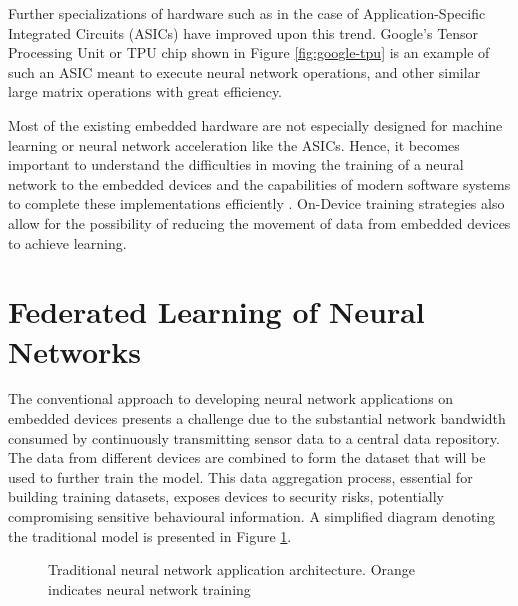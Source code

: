 Further specializations of hardware such as in the case of Application-Specific Integrated Circuits (ASICs) have improved upon this trend. Google's Tensor Processing Unit or TPU chip shown in Figure \ref{fig:google-tpu} is an example of such an ASIC meant to execute neural network operations, and other similar large matrix operations with great efficiency.

Most of the existing embedded hardware are not especially designed for machine learning or neural network acceleration like the ASICs. Hence, it becomes important to understand the difficulties in moving the training of a neural network to the embedded devices and the capabilities of modern software systems to complete these implementations efficiently \cite{zhu2023ondevice}. On-Device training strategies also allow for the possibility of reducing the movement of data from embedded devices to achieve learning.

\section{Federated Learning of Neural Networks}

The conventional approach to developing neural network applications on embedded devices presents a challenge due to the substantial network bandwidth consumed by continuously transmitting sensor data to a central data repository. The data from different devices are combined to form the dataset that will be used to further train the model. This data aggregation process, essential for building training datasets, exposes devices to security risks, potentially compromising sensitive behavioural information. A simplified diagram denoting the traditional model is presented in Figure \ref{fig:nn-traditional}.

\begin{figure}[h]
	\centering
	\caption{Traditional neural network application architecture. Orange indicates neural network training}
	\label{fig:nn-traditional}
\end{figure}

